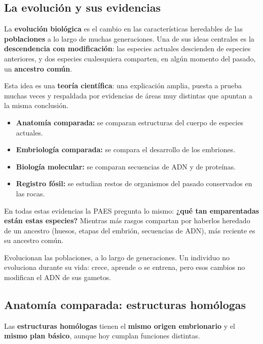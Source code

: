 \subsection{La evolución y sus evidencias}
La \textbf{evolución biológica} es el cambio en las características heredables de las \textbf{poblaciones} a lo largo de muchas generaciones. Una de sus ideas centrales es la \textbf{descendencia con modificación}: las especies actuales descienden de especies anteriores, y dos especies cualesquiera comparten, en algún momento del pasado, un \textbf{ancestro común}.

 

Esta idea es una \textbf{teoría científica}: una explicación amplia, puesta a prueba muchas veces y respaldada por evidencias de áreas muy distintas que apuntan a la misma conclusión.

 
\begin{itemize}
  \item \textbf{Anatomía comparada:} se comparan estructuras del cuerpo de especies actuales.
  \item \textbf{Embriología comparada:} se compara el desarrollo de los embriones.
  \item \textbf{Biología molecular:} se comparan secuencias de ADN y de proteínas.
  \item \textbf{Registro fósil:} se estudian restos de organismos del pasado conservados en las rocas.
\end{itemize}
  
\begin{clave} En todas estas evidencias la PAES pregunta lo mismo: \textbf{¿qué tan emparentadas están estas especies?} Mientras más rasgos compartan por haberlos heredado de un ancestro (huesos, etapas del embrión, secuencias de ADN), más reciente es su ancestro común.\end{clave}
 
\begin{clave}[{Recuerda}] Evolucionan las poblaciones, a lo largo de generaciones. Un individuo no evoluciona durante su vida: crece, aprende o se entrena, pero esos cambios no modifican el ADN de sus gametos.\end{clave}
\subsection{Anatomía comparada: estructuras homólogas}
Las \textbf{estructuras homólogas} tienen el \textbf{mismo origen embrionario} y el \textbf{mismo plan básico}, aunque hoy cumplan funciones distintas.

